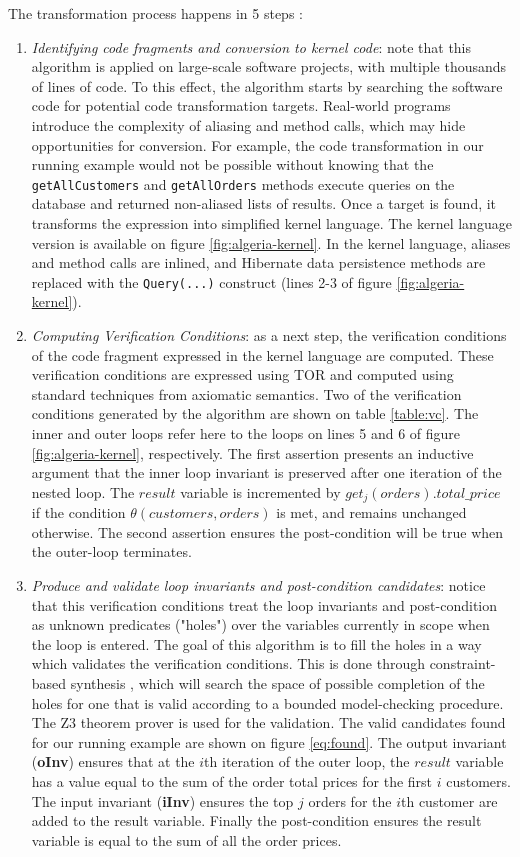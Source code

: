 The transformation process happens in 5 steps :
\begin{enumerate}
\item{\emph{Identifying code fragments and conversion to kernel code}: note that this algorithm is applied on large-scale software projects, with multiple thousands of lines of code. To this effect, the algorithm starts by searching the software code for potential code transformation targets. Real-world programs introduce the complexity of aliasing and method calls, which may hide opportunities for conversion. For example, the code transformation in our running example would not be possible without knowing that the \texttt{getAllCustomers} and \texttt{getAllOrders} methods execute queries on the database and returned non-aliased lists of results. Once a target is found, it transforms the expression into simplified kernel language. The kernel language version is available on figure \ref{fig:algeria-kernel}. In the kernel language, aliases and method calls are inlined, and Hibernate data persistence methods are replaced with the \texttt{Query(...)} construct (lines 2-3 of figure \ref{fig:algeria-kernel}).}
\item{\emph{Computing Verification Conditions}: as a next step, the verification conditions of the code fragment expressed in the kernel language are computed. These verification conditions are expressed using TOR and computed using standard techniques from axiomatic semantics. Two of the verification conditions generated by the algorithm are shown on table \ref{table:vc}. The inner and outer loops refer here to the loops on lines 5 and 6 of figure \ref{fig:algeria-kernel}, respectively. The first assertion presents an inductive argument that the inner loop invariant is preserved after one iteration of the nested loop. The $result$ variable is incremented by $get_j(orders).total\_price$ if the condition $\theta(customers, orders)$ is met, and remains unchanged otherwise. The second assertion ensures the post-condition will be true when the outer-loop terminates. } 
\item{\emph{Produce and validate loop invariants and post-condition candidates}: notice that this verification conditions treat the loop invariants and post-condition as unknown predicates ("holes") over the variables currently in scope when the loop is entered. The goal of this algorithm is to fill the holes in a way which validates the verification conditions. This is done through constraint-based synthesis \cite{solar-lezama:2006aa}, which will search the space of possible completion of the holes for one that is valid according to a bounded model-checking procedure. The Z3 \cite{Z3} theorem prover is used for the validation. The valid candidates found for our running example are shown on figure \ref{eq:found}. The output invariant (\textbf{oInv}) ensures that at the $i$th iteration of the outer loop, the $result$ variable has a value equal to the sum of the order total prices for the first $i$ customers. The input invariant (\textbf{iInv}) ensures the top $j$ orders for the $i$th customer are added to the result variable. Finally the post-condition ensures the result variable is equal to the sum of all the order prices.}

\end{enumerate}
